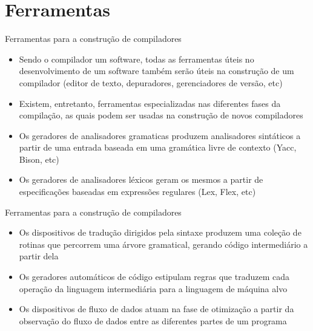 \section{Ferramentas}

\begin{frame}[fragile]{Ferramentas para a construção de compiladores}

    \begin{itemize}
        \item Sendo o compilador um software, todas as ferramentas úteis no desenvolvimento de um software também serão úteis na construção de um compilador
        (editor de texto, depuradores, gerenciadores de versão, etc)
        \pause
        
        \item Existem, entretanto, ferramentas especializadas nas diferentes fases da compilação, as quais podem ser usadas na construção de novos compiladores
        \pause

        \item Os geradores de analisadores gramaticas produzem analisadores sintáticos a partir de uma entrada baseada em uma gramática livre de contexto (Yacc,
        Bison, etc)
        \pause

        \item Os geradores de analisadores léxicos geram os mesmos a partir de especificações baseadas em expressões regulares (Lex, Flex, etc)
    \end{itemize}

\end{frame}

\begin{frame}[fragile]{Ferramentas para a construção de compiladores}

    \begin{itemize}
        \item Os dispositivos de tradução dirigidos pela sintaxe produzem uma coleção de rotinas que percorrem uma árvore gramatical, gerando código intermediário
        a partir dela 
        \pause
        
        \item Os geradores automáticos de código estipulam regras que traduzem cada operação da linguagem intermediária para a linguagem de máquina alvo
        \pause

        \item Os dispositivos de fluxo de dados atuam na fase de otimização a partir da observação do fluxo de dados entre as diferentes partes de um programa
    \end{itemize}

\end{frame}

